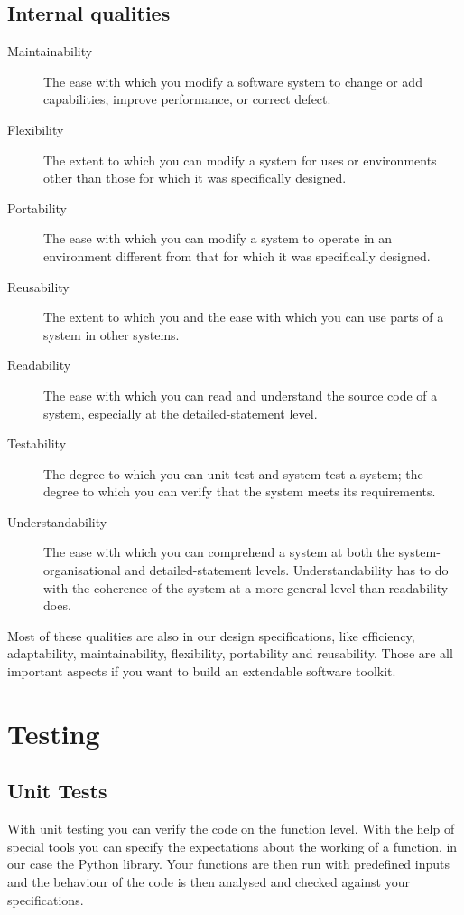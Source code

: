 \documentclass[a4paper, openany, oneside]{memoir}
\begin{document}
\subsection{Internal qualities}
\begin{description}
\item[Maintainability] The ease with which you modify a software system to change or add capabilities, improve performance, or correct defect.
\item[Flexibility] The extent to which you can modify a system for uses or environments other than those for which it was specifically designed.
\item[Portability] The ease with which you can modify a system to operate in an environment different from that for which it was specifically designed.
\item[Reusability] The extent to which you and the ease with which you can use parts of a system in other systems.
\item[Readability] The ease with which you can read and understand the source code of a system, especially at the detailed-statement level.
\item[Testability] The degree to which you can unit-test and system-test a system; the degree to which you can verify that the system meets its requirements.
\item[Understandability] The ease with which you can comprehend a system at both the system-organisational and detailed-statement levels. Understandability has to do with the coherence of the system at a more general level than readability does.
\end{description}

Most of these qualities are also in our design specifications, like efficiency, adaptability, maintainability, flexibility, portability and reusability. Those are all important aspects if you want to build an extendable software toolkit.



\section{Testing}
\subsection{Unit Tests}
With unit testing you can verify the code on the function level. With the help of special tools you can specify the expectations about the working of a function, in our case the Python  library. Your functions are then run with predefined inputs and the behaviour of the code is then analysed and checked against your specifications.
\end{document}
